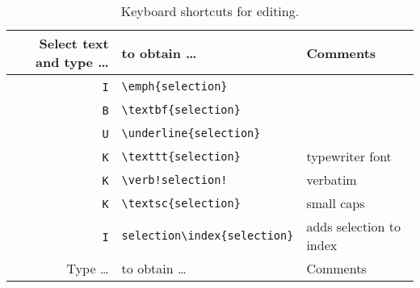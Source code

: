 \documentclass[10pt]{article}
\begin{document}
\begin{table}
\centering
\caption{Keyboard shortcuts for editing.}
\begin{tabular}{r|l|l}
	Select text and type \dots   & to obtain \dots                        & Comments        \\
	\hline
	\cmdkey~\texttt{I}           & \verb!\emph{selection}!                &                 \\
	\cmdkey~\texttt{B}           & \verb!\textbf{selection}!              &                 \\
	\cmdkey~\texttt{U}           & \verb!\underline{selection}!           &                 \\
	\cmdkey~\texttt{K}           & \verb!\texttt{selection}!              & typewriter font \\
	\cmdkey~\optkey~\texttt{K}   & \verb=\verb!selection!=                & verbatim        \\
	\cmdkey~\shiftkey~\texttt{K} & \verb!\textsc{selection}!              & small caps      \\
	\ctlkey~\shiftkey~\texttt{I} & \verb!selection\index{selection}!      & adds selection to index \\
	
	\hline
	Type \dots   & to obtain \dots                        & Comments           \\  	 
	\hline
		

\end{tabular}
\end{table}
\end{document}
